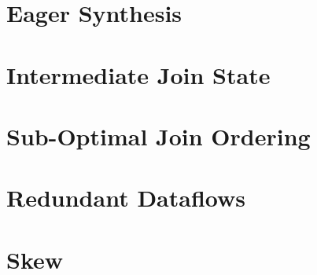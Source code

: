\documentclass[../index.tex]{subfiles}
\begin{document}
\section{Eager Synthesis} \label{case-eagerness}

\newpage

\section{Intermediate Join State} \label{case-join-state}

\newpage

\section{Sub-Optimal Join Ordering} \label{case-join-ordering}

\newpage

\section{Redundant Dataflows} \label{case-redundant-dataflows}

\newpage

\section{Skew} \label{case-skew} \label{case-skew}

\newpage
\end{document}
